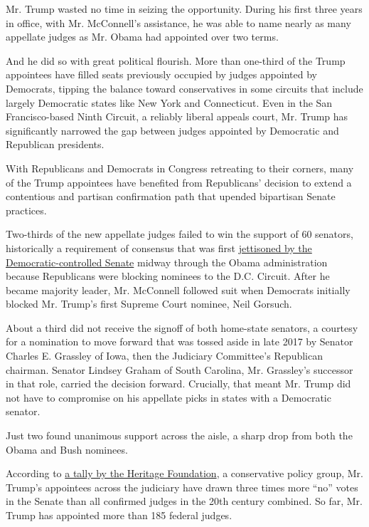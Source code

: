 Mr. Trump wasted no time in seizing the opportunity. During his first
three years in office, with Mr. McConnell's assistance, he was able to
name nearly as many appellate judges as Mr. Obama had appointed over two
terms.

And he did so with great political flourish. More than one-third of the
Trump appointees have filled seats previously occupied by judges
appointed by Democrats, tipping the balance toward conservatives in some
circuits that include largely Democratic states like New York and
Connecticut. Even in the San Francisco-based Ninth Circuit, a reliably
liberal appeals court, Mr. Trump has significantly narrowed the gap
between judges appointed by Democratic and Republican presidents.

With Republicans and Democrats in Congress retreating to their corners,
many of the Trump appointees have benefited from Republicans' decision
to extend a contentious and partisan confirmation path that upended
bipartisan Senate practices.

Two-thirds of the new appellate judges failed to win the support of 60
senators, historically a requirement of consensus that was first
\href{https://www.nytimes.com/2013/11/22/us/politics/reid-sets-in-motion-steps-to-limit-use-of-filibuster.html}{jettisoned
by the Democratic-controlled Senate} midway through the Obama
administration because Republicans were blocking nominees to the D.C.
Circuit. After he became majority leader, Mr. McConnell followed suit
when Democrats initially blocked Mr. Trump's first Supreme Court
nominee, Neil Gorsuch.

About a third did not receive the signoff of both home-state senators, a
courtesy for a nomination to move forward that was tossed aside in late
2017 by Senator Charles E. Grassley of Iowa, then the Judiciary
Committee's Republican chairman. Senator Lindsey Graham of South
Carolina, Mr. Grassley's successor in that role, carried the decision
forward. Crucially, that meant Mr. Trump did not have to compromise on
his appellate picks in states with a Democratic senator.

Just two found unanimous support across the aisle, a sharp drop from
both the Obama and Bush nominees.

According to
\href{https://www.heritage.org/courts/commentary/filling-the-judicial-confirmation-stocking}{a
tally by the Heritage Foundation}, a conservative policy group, Mr.
Trump's appointees across the judiciary have drawn three times more
``no'' votes in the Senate than all confirmed judges in the 20th century
combined. So far, Mr. Trump has appointed more than 185 federal judges.


